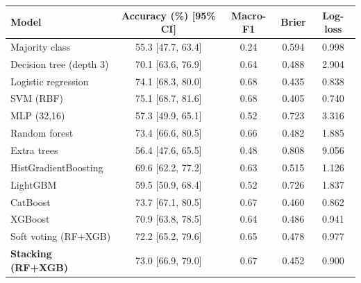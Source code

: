 \begin{tabular}{@{}lcccc@{}}
\toprule
Model & Accuracy (\%) [95\% CI] & Macro-F1 & Brier & Log-loss\\
\midrule
Majority class & 55.3 [47.7, 63.4] & 0.24 & 0.594 & 0.998\\\midrule
Decision tree (depth 3) & 70.1 [63.6, 76.9] & 0.64 & 0.488 & 2.904\\
Logistic regression & 74.1 [68.3, 80.0] & 0.68 & 0.435 & 0.838\\
SVM (RBF) & 75.1 [68.7, 81.6] & 0.68 & 0.405 & 0.740\\\midrule
MLP (32,16) & 57.3 [49.9, 65.1] & 0.52 & 0.723 & 3.316\\
Random forest & 73.4 [66.6, 80.5] & 0.66 & 0.482 & 1.885\\
Extra trees & 56.4 [47.6, 65.5] & 0.48 & 0.808 & 9.056\\
HistGradientBoosting & 69.6 [62.2, 77.2] & 0.63 & 0.515 & 1.126\\
LightGBM & 59.5 [50.9, 68.4] & 0.52 & 0.726 & 1.837\\
CatBoost & 73.7 [67.1, 80.5] & 0.67 & 0.460 & 0.862\\\midrule
XGBoost & 70.9 [63.8, 78.5] & 0.64 & 0.486 & 0.941\\
Soft voting (RF+XGB) & 72.2 [65.2, 79.6] & 0.65 & 0.478 & 0.977\\
\textbf{Stacking (RF+XGB)} & 73.0 [66.9, 79.0] & 0.67 & 0.452 & 0.900\\
\bottomrule
\end{tabular}